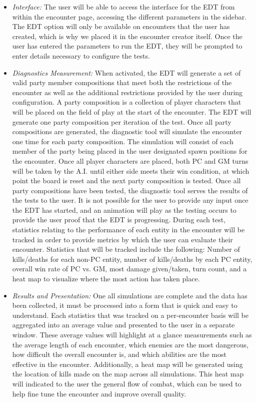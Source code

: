 \documentclass[letterpaper, 10 pt, conference]{ieeeconf}
\begin{document}
\begin{itemize}
	\item \textit{Interface:} The user will be able to access the interface for the EDT
	from within the encounter page, accessing the different parameters in the sidebar.
	The EDT option will only be available on encounters that
	the user has created, which is why we placed it in the encounter creator itself.
	Once the user has entered the parameters to run the EDT, they
	will be prompted to enter details necessary to configure the tests. \\
	\item \textit{Diagnostics Measurement:} When activated, the EDT will generate a set of valid party
	member compositions that meet both the restrictions of the encounter as well as
	the additional restrictions provided by the user during configuration. A party
	composition is a collection of player characters that will be placed on the field of
	play at the start of the encounter. The EDT will generate one party
	composition per iteration of the test. Once all party compositions are generated,
	the diagnostic tool will simulate the encounter one time for each party composition.
	The simulation will consist of each member of the party being placed in the
	user designated spawn positions for the encounter. Once all player characters
	are placed, both PC and GM turns will be taken by the A.I. until either side
	meets their win condition, at which point the board is reset and the next party
	composition is tested. Once all party compositions have been tested, the diagnostic
	tool serves the results of the tests to the user. It is not possible for the user to provide any input once the EDT has started, and an animation will play as the testing occurs to provide the user proof that the EDT is progressing. During each test, statistics relating to the performance of each entity in the
	encounter will be tracked in order to provide metrics by which the user can evaluate
	their encounter. Statistics that will be tracked include the following: Number of kills/deaths for each non-PC entity, number of kills/deaths by each PC entity, overall win rate of PC vs. GM, most damage given/taken, turn count, and a heat map to visualize where the most action has taken place. \\
	\item \textit{Results and Presentation:} One all simulations are complete and the data has been collected, it must be
	processed into a form that is quick and easy to understand. Each statistics that
	was tracked on a per-encounter basis will be aggregated into an average value and
	presented to the user in a separate window. These average values will highlight
	at a glance measurements such as the average length of each encounter, which
	enemies are the most dangerous, how difficult the overall encounter is, and which
	abilities are the most effective in the encounter. Additionally, a heat map will be
	generated using the location of kills made on the map across all simulations. This
	heat map will indicated to the user the general flow of combat, which can be used
	to help fine tune the encounter and improve overall quality.
\end{itemize}
\end{document}
